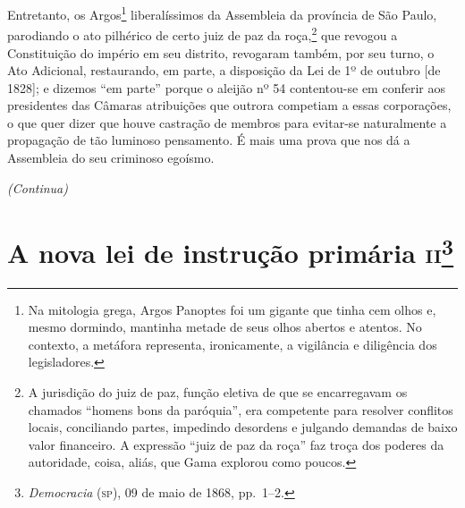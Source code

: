 Entretanto, os Argos\footnote{Na mitologia grega, Argos Panoptes foi
  um gigante que tinha cem olhos e, mesmo dormindo, mantinha metade de
  seus olhos abertos e atentos. No contexto, a metáfora representa,
  ironicamente, a vigilância e diligência dos legisladores.}
liberalíssimos da Assembleia da província de São Paulo, parodiando o ato
pilhérico de certo juiz de paz da roça,\footnote{A jurisdição do juiz
  de paz, função eletiva de que se encarregavam os chamados ``homens bons
  da paróquia'', era competente para resolver conflitos locais,
  conciliando partes, impedindo desordens e julgando demandas de baixo
  valor financeiro. A expressão ``juiz de paz da roça'' faz troça dos
  poderes da autoridade, coisa, aliás, que Gama explorou como poucos.}
que revogou a Constituição do império em seu distrito, revogaram também,
por seu turno, o Ato Adicional, restaurando, em parte, a disposição da
Lei de 1º de outubro {[}de 1828{]}; e dizemos ``em parte'' porque o
aleijão nº 54 contentou-se em conferir aos presidentes das Câmaras
atribuições que outrora competiam a essas corporações, o que quer dizer
que houve castração de membros para evitar-se naturalmente a propagação
de tão luminoso pensamento. É mais uma prova que nos dá a Assembleia do
seu criminoso egoísmo.

\begin{center} %
\emph{(Continua)}
\end{center}

\chapter{A nova lei de instrução primária \textsc{ii}\footnote{\emph{Democracia} (\textsc{sp}), 09 de maio de 1868, pp.~1--2.}} %

